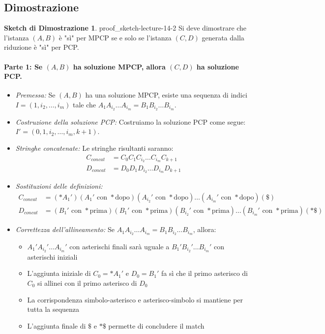 \documentclass[a4paper]{article}
\theoremstyle{definition} %
\newtheorem{proof_sketch}{Sketch di Dimostrazione} %
\theoremstyle{remark} %
\begin{document}
\subsection{Dimostrazione}
\begin{proof_sketch}{}{{ proof_sketch-lecture-14-2 }}
Si deve dimostrare che l'istanza $(A, B)$ è "sì" per MPCP se e solo se l'istanza $(C, D)$ generata dalla riduzione è "sì" per PCP.

\paragraph{Parte 1: Se $(A, B)$ ha soluzione MPCP, allora $(C, D)$ ha soluzione PCP.}

\begin{itemize}
    \item \emph{Premessa:} Se $(A, B)$ ha una soluzione MPCP, esiste una sequenza di indici $I = (1, i_2, \dots, i_m)$ tale che $A_1 A_{i_2} \dots A_{i_m} = B_1 B_{i_2} \dots B_{i_m}$.
    
    \item \emph{Costruzione della soluzione PCP:} Costruiamo la soluzione PCP come segue: $I' = (0, 1, i_2, \dots, i_m, k+1)$.
    
    \item \emph{Stringhe concatenate:} Le stringhe risultanti saranno:
    \begin{align}
        C_{concat} &= C_0 C_1 C_{i_2} \dots C_{i_m} C_{k+1} \\
        D_{concat} &= D_0 D_1 D_{i_2} \dots D_{i_m} D_{k+1}
    \end{align}
    
    \item \emph{Sostituzioni delle definizioni:}
    \begin{align}
        C_{concat} &= (* A_1') (A_1' \text{ con } * \text{dopo}) (A_{i_2}' \text{ con } * \text{dopo}) \dots (A_{i_m}' \text{ con } * \text{dopo}) (\$) \\
        D_{concat} &= (B_1' \text{ con } * \text{prima}) (B_1' \text{ con } * \text{prima}) (B_{i_2}' \text{ con } * \text{prima}) \dots (B_{i_m}' \text{ con } * \text{prima}) (*\$)
    \end{align}
    
    \item \emph{Correttezza dell'allineamento:} Se $A_1 A_{i_2} \dots A_{i_m} = B_1 B_{i_2} \dots B_{i_m}$, allora:
    \begin{itemize}
        \item $A_1' A_{i_2}' \dots A_{i_m}'$ con asterischi finali sarà uguale a $B_1' B_{i_2}' \dots B_{i_m}'$ con asterischi iniziali
        \item L'aggiunta iniziale di $C_0 = *A_1'$ e $D_0 = B_1'$ fa sì che il primo asterisco di $C_0$ si allinei con il primo asterisco di $D_0$
        \item La corrispondenza simbolo-asterisco e asterisco-simbolo si mantiene per tutta la sequenza
        \item L'aggiunta finale di $\$$ e $*\$$ permette di concludere il match
    \end{itemize}
\end{itemize}


\end{proof_sketch}
\end{document}
